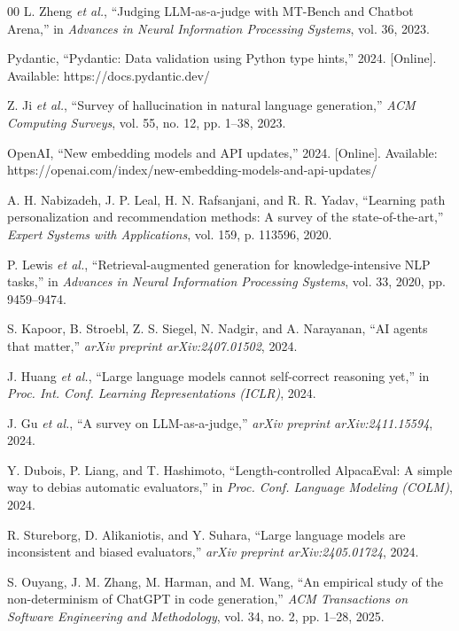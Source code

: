 \begin{thebibliography}{00}
 L. Zheng \emph{et al.}, ``Judging LLM-as-a-judge with MT-Bench and Chatbot Arena,'' in \emph{Advances in Neural Information Processing Systems}, vol. 36, 2023.

 Pydantic, ``Pydantic: Data validation using Python type hints,'' 2024. [Online]. Available: https://docs.pydantic.dev/

 Z. Ji \emph{et al.}, ``Survey of hallucination in natural language generation,'' \emph{ACM Computing Surveys}, vol. 55, no. 12, pp. 1--38, 2023.

 OpenAI, ``New embedding models and API updates,'' 2024. [Online]. Available: https://openai.com/index/new-embedding-models-and-api-updates/

 A. H. Nabizadeh, J. P. Leal, H. N. Rafsanjani, and R. R. Yadav, ``Learning path personalization and recommendation methods: A survey of the state-of-the-art,'' \emph{Expert Systems with Applications}, vol. 159, p. 113596, 2020.

 P. Lewis \emph{et al.}, ``Retrieval-augmented generation for knowledge-intensive NLP tasks,'' in \emph{Advances in Neural Information Processing Systems}, vol. 33, 2020, pp. 9459--9474.

 S. Kapoor, B. Stroebl, Z. S. Siegel, N. Nadgir, and A. Narayanan, ``AI agents that matter,'' \emph{arXiv preprint arXiv:2407.01502}, 2024.

 J. Huang \emph{et al.}, ``Large language models cannot self-correct reasoning yet,'' in \emph{Proc. Int. Conf. Learning Representations (ICLR)}, 2024.

 J. Gu \emph{et al.}, ``A survey on LLM-as-a-judge,'' \emph{arXiv preprint arXiv:2411.15594}, 2024.

 Y. Dubois, P. Liang, and T. Hashimoto, ``Length-controlled AlpacaEval: A simple way to debias automatic evaluators,'' in \emph{Proc. Conf. Language Modeling (COLM)}, 2024.

 R. Stureborg, D. Alikaniotis, and Y. Suhara, ``Large language models are inconsistent and biased evaluators,'' \emph{arXiv preprint arXiv:2405.01724}, 2024.

 S. Ouyang, J. M. Zhang, M. Harman, and M. Wang, ``An empirical study of the non-determinism of ChatGPT in code generation,'' \emph{ACM Transactions on Software Engineering and Methodology}, vol. 34, no. 2, pp. 1--28, 2025.


\end{thebibliography}

